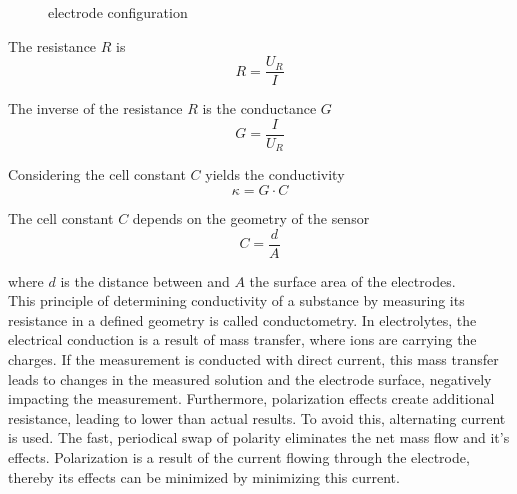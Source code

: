 \begin{figure}
	\begin{center}
    	\tikzset{external/export next=false}
		\caption{electrode configuration}
		\label{fig:elec}
	\end{center}
\end{figure}

The resistance $ R $ is
\begin{equation}
	R = \dfrac{U_R}{I}
\label{eq:R}
\end{equation}

The inverse of the resistance $ R $ is the conductance $ G $
\begin{equation}
	G = \dfrac{I}{U_R}
\label{eq:G}
\end{equation}

Considering the cell constant $ C $ yields the conductivity
\begin{equation}
	\kappa = G \cdot C
\label{eq:kappa} 
\end{equation}

The cell constant $ C $ depends on the geometry of the sensor
\begin{equation}
	C = \dfrac{d}{A}
\label{eq:C}
\end{equation}

where $ d $ is the distance between and $ A $ the surface area of  the electrodes. \\

This principle of determining conductivity of a substance by measuring its resistance in a defined geometry is called conductometry. In electrolytes, the electrical conduction is a result of mass transfer, where ions are carrying the charges. If the measurement is conducted with direct current, this mass transfer leads to changes in the measured solution and the electrode surface, negatively impacting the measurement. Furthermore, polarization effects create additional resistance, leading to lower than actual results. To avoid this, alternating current is used. The fast, periodical swap of polarity eliminates the net mass flow and it's effects. Polarization is a result of the current flowing through the electrode, thereby its effects can be minimized by minimizing this current.

